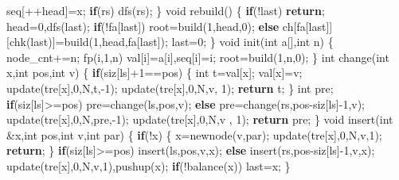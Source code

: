 \documentclass[
]{article}
\newenvironment{Shaded}{}{}
\newcommand{\ControlFlowTok}[1]{\textcolor[rgb]{0.00,0.44,0.13}{\textbf{#1}}}
\newcommand{\DataTypeTok}[1]{\textcolor[rgb]{0.56,0.13,0.00}{#1}}
\newcommand{\DecValTok}[1]{\textcolor[rgb]{0.25,0.63,0.44}{#1}}
\newcommand{\NormalTok}[1]{#1}
\begin{document}
\begin{Shaded}
\begin{Highlighting}[]
\NormalTok{        seq[++head]=x;}
        \ControlFlowTok{if}\NormalTok{(rs) dfs(rs);}
\NormalTok{    \}}
    \DataTypeTok{void}\NormalTok{ rebuild()}
\NormalTok{    \{}
        \ControlFlowTok{if}\NormalTok{(!last) }\ControlFlowTok{return}\NormalTok{;}
\NormalTok{        head=}\DecValTok{0}\NormalTok{,dfs(last);}
        \ControlFlowTok{if}\NormalTok{(!fa[last]) root=build(}\DecValTok{1}\NormalTok{,head,}\DecValTok{0}\NormalTok{);}
        \ControlFlowTok{else}\NormalTok{ ch[fa[last]][chk(last)]=build(}\DecValTok{1}\NormalTok{,head,fa[last]);}
\NormalTok{        last=}\DecValTok{0}\NormalTok{;}
\NormalTok{    \}}
    \DataTypeTok{void}\NormalTok{ init(}\DataTypeTok{int}\NormalTok{ a[],}\DataTypeTok{int}\NormalTok{ n)}
\NormalTok{    \{}
\NormalTok{        node\_cnt+=n;}
\NormalTok{        fp(i,}\DecValTok{1}\NormalTok{,n) val[i]=a[i],seq[i]=i;}
\NormalTok{        root=build(}\DecValTok{1}\NormalTok{,n,}\DecValTok{0}\NormalTok{);}
\NormalTok{    \}}
    \DataTypeTok{int}\NormalTok{ change(}\DataTypeTok{int}\NormalTok{ x,}\DataTypeTok{int}\NormalTok{ pos,}\DataTypeTok{int}\NormalTok{ v)}
\NormalTok{    \{}
        \ControlFlowTok{if}\NormalTok{(siz[ls]+}\DecValTok{1}\NormalTok{==pos)}
\NormalTok{        \{}
            \DataTypeTok{int}\NormalTok{ t=val[x]; val[x]=v;}
\NormalTok{            update(tre[x],}\DecValTok{0}\NormalTok{,N,t,{-}}\DecValTok{1}\NormalTok{);}
\NormalTok{            update(tre[x],}\DecValTok{0}\NormalTok{,N,v, }\DecValTok{1}\NormalTok{);}
            \ControlFlowTok{return}\NormalTok{ t;}
\NormalTok{        \}}
        \DataTypeTok{int}\NormalTok{ pre;}
        \ControlFlowTok{if}\NormalTok{(siz[ls]\textgreater{}=pos) pre=change(ls,pos,v);}
        \ControlFlowTok{else}\NormalTok{ pre=change(rs,pos{-}siz[ls]{-}}\DecValTok{1}\NormalTok{,v);}
\NormalTok{        update(tre[x],}\DecValTok{0}\NormalTok{,N,pre,{-}}\DecValTok{1}\NormalTok{);}
\NormalTok{        update(tre[x],}\DecValTok{0}\NormalTok{,N,v  , }\DecValTok{1}\NormalTok{);}
        \ControlFlowTok{return}\NormalTok{ pre;}
\NormalTok{    \}}
    \DataTypeTok{void}\NormalTok{ insert(}\DataTypeTok{int}\NormalTok{ \&x,}\DataTypeTok{int}\NormalTok{ pos,}\DataTypeTok{int}\NormalTok{ v,}\DataTypeTok{int}\NormalTok{ par)}
\NormalTok{    \{}
        \ControlFlowTok{if}\NormalTok{(!x)}
\NormalTok{        \{}
\NormalTok{            x=newnode(v,par);}
\NormalTok{            update(tre[x],}\DecValTok{0}\NormalTok{,N,v,}\DecValTok{1}\NormalTok{);}
            \ControlFlowTok{return}\NormalTok{;}
\NormalTok{        \}}
        \ControlFlowTok{if}\NormalTok{(siz[ls]\textgreater{}=pos) insert(ls,pos,v,x);}
        \ControlFlowTok{else}\NormalTok{ insert(rs,pos{-}siz[ls]{-}}\DecValTok{1}\NormalTok{,v,x);}
\NormalTok{        update(tre[x],}\DecValTok{0}\NormalTok{,N,v,}\DecValTok{1}\NormalTok{),pushup(x);}
        \ControlFlowTok{if}\NormalTok{(!balance(x)) last=x;}
\NormalTok{    \}}


\end{Highlighting}
\end{Shaded}
\end{document}
